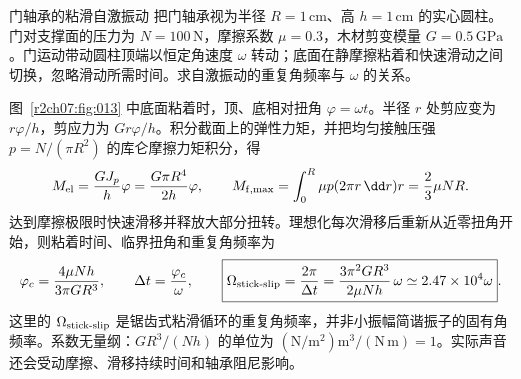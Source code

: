 \begin{practicebox}{门轴承的粘滑自激振动}
把门轴承视为半径 $R=1\,\mathrm{cm}$、高 $h=1\,\mathrm{cm}$ 的实心圆柱。门对支撑面的压力为 $N=100\,\mathrm N$，摩擦系数 $\mu=0.3$，木材剪变模量 $G=0.5\,\mathrm{GPa}$。门运动带动圆柱顶端以恒定角速度 $\omega$ 转动；底面在静摩擦粘着和快速滑动之间切换，忽略滑动所需时间。求自激振动的重复角频率与 $\omega$ 的关系。
\label{r2ch07:pr:006}
\begin{solution}
图~\ref{r2ch07:fig:013} 中底面粘着时，顶、底相对扭角 $\varphi=\omega t$。半径 $r$ 处剪应变为 $r\varphi/h$，剪应力为 $Gr\varphi/h$。积分截面上的弹性力矩，并把均匀接触压强 $p=N/(\pi R^2)$ 的库仑摩擦力矩积分，得
\begin{equation}
 M_{\rm el}=\frac{GJ_p}{h}\varphi
 =\frac{G\pi R^4}{2h}\varphi,\qquad
 M_{\rm f,max}=\int_0^R\mu p(2\pi r\,\dd r)r
 =\frac23\mu NR.
 \label{r2ch07:eq:040}
\end{equation}
达到摩擦极限时快速滑移并释放大部分扭转。理想化每次滑移后重新从近零扭角开始，则粘着时间、临界扭角和重复角频率为
\begin{equation}
 \varphi_c=\frac{4\mu Nh}{3\pi GR^3},\qquad
 \Delta t=\frac{\varphi_c}{\omega},\qquad
 \boxed{\Omega_{\rm stick\text{-}slip}=\frac{2\pi}{\Delta t}
 =\frac{3\pi^2GR^3}{2\mu Nh}\,\omega
 \simeq2.47\times10^4\omega}.
 \label{r2ch07:eq:041}
\end{equation}
这里的 $\Omega_{\rm stick\text{-}slip}$ 是锯齿式粘滑循环的重复角频率，并非小振幅简谐振子的固有角频率。系数无量纲：$GR^3/(Nh)$ 的单位为 $(\mathrm{N/m^2})\mathrm m^3/(\mathrm N\,\mathrm m)=1$。实际声音还会受动摩擦、滑移持续时间和轴承阻尼影响。
\figDoorBearing
\end{solution}
\end{practicebox}
